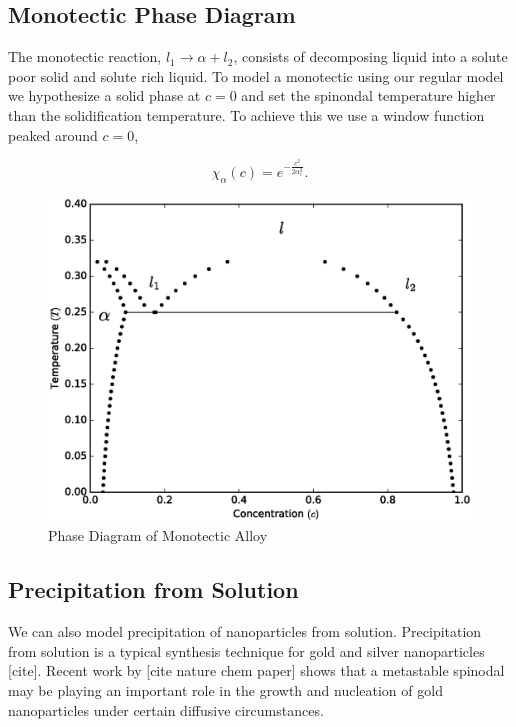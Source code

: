 \documentclass[showkeys, prb, reprint]{revtex4-1}
\newcommand{\f}{\frac}
\begin{document}
\subsection{Monotectic Phase Diagram}

The monotectic reaction, $l_1 \rightarrow \alpha + l_2$, consists of decomposing liquid into a solute poor solid and solute rich liquid. To model a monotectic using our regular model we hypothesize a solid phase at $c=0$ and set the spinondal temperature higher than the solidification temperature. To achieve this we use a window function peaked around $c = 0$,

\begin{equation}
    \chi_\alpha(c) = e^{-\f{c^2}{2\alpha_c^2}}.
\end{equation}

\begin{figure}
	\includegraphics[scale=0.3]{monotectic.eps}
	\caption{\label{monotectic} Phase Diagram of Monotectic Alloy}
\end{figure}

\subsection{Precipitation from Solution}

We can also model precipitation of nanoparticles from solution. Precipitation from solution is a typical synthesis technique for gold and silver nanoparticles [cite]. Recent work by [cite nature chem paper] shows that a metastable spinodal may be playing an important role in the growth and nucleation of gold nanoparticles under certain diffusive circumstances.
\end{document}

